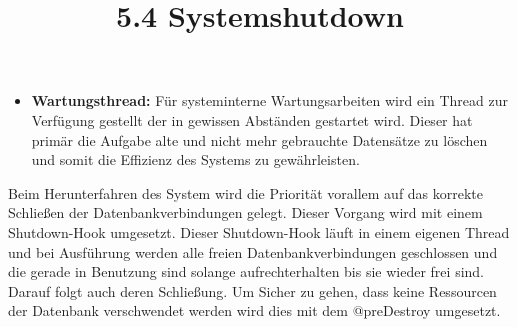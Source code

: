 \begin{itemize}
			\item \textbf{Wartungsthread:} 
			Für systeminterne Wartungsarbeiten wird ein Thread zur Verfügung gestellt der in gewissen Abständen gestartet wird. Dieser hat primär die Aufgabe alte und nicht mehr gebrauchte Datensätze zu löschen und somit die Effizienz des Systems zu gewährleisten.
		\end{itemize} 
	
	\title{5.4 Systemshutdown}
	Beim Herunterfahren des System wird die Priorität vorallem auf das korrekte Schließen der Datenbankverbindungen gelegt. Dieser Vorgang wird mit einem Shutdown-Hook umgesetzt. Dieser Shutdown-Hook läuft in einem eigenen Thread und bei Ausführung werden alle freien Datenbankverbindungen geschlossen und die gerade in Benutzung sind solange aufrechterhalten bis sie wieder frei sind. Darauf folgt auch deren Schließung. Um Sicher zu gehen, dass keine Ressourcen der Datenbank verschwendet werden wird dies mit dem @preDestroy umgesetzt. 
   